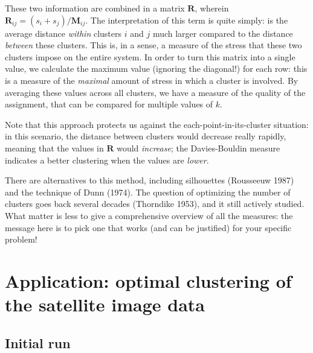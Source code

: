 \documentclass[
  letterpaper,
]{scrbook}
\begin{document}
These two information are combined in a matrix \(\mathbf{R}\), wherein
\(\mathbf{R}_{ij} = (s_i + s_j)/\mathbf{M}_{ij}\). The interpretation of
this term is quite simply: is the average distance \emph{within}
clusters \(i\) and \(j\) much larger compared to the distance
\emph{between} these clusters. This is, in a sense, a measure of the
stress that these two clusters impose on the entire system. In order to
turn this matrix into a single value, we calculate the maximum value
(ignoring the diagonal!) for each row: this is a measure of the
\emph{maximal} amount of stress in which a cluster is involved. By
averaging these values across all clusters, we have a measure of the
quality of the assignment, that can be compared for multiple values of
\(k\).

Note that this approach protects us against the
each-point-in-its-cluster situation: in this scenario, the distance
between clusters would decrease really rapidly, meaning that the values
in \(\mathbf{R}\) would \emph{increase}; the Davies-Bouldin measure
indicates a better clustering when the values are \emph{lower}.


There are alternatives to this method, including silhouettes (Rousseeuw
1987) and the technique of Dunn (1974). The question of optimizing the
number of clusters goes back several decades (Thorndike 1953), and it
still actively studied. What matter is less to give a comprehensive
overview of all the measures: the message here is to pick one that works
(and can be justified) for your specific problem!

\section{Application: optimal clustering of the satellite image
data}\label{application-optimal-clustering-of-the-satellite-image-data}

\subsection{Initial run}\label{sec-kmeans-initial}
\end{document}
